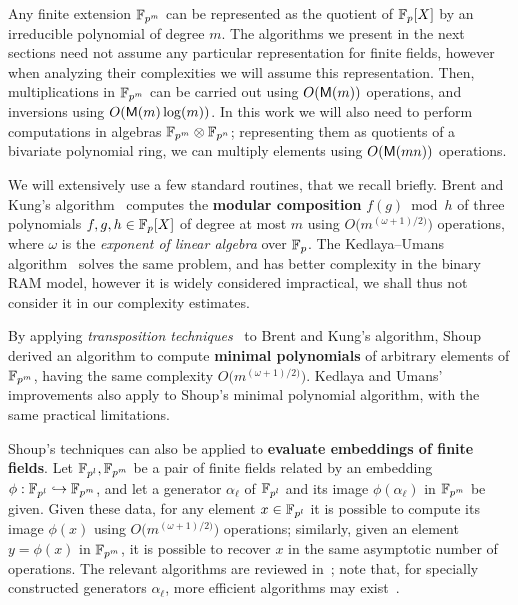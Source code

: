 \documentclass{sig-alternate}
\begin{document}
Any finite extension $\mathbb{F}_{p^m}$ can be represented as the quotient of
$\mathbb{F}_p[X]$ by an irreducible polynomial of degree $m$. %
The algorithms we present in the next sections need not assume any
particular representation for finite fields, however when analyzing
their complexities we will assume this representation. %
Then, multiplications in $\mathbb{F}_{p^m}$ can be carried out using
$O(\mathsf{M}(m))$ operations, and inversions using $O(\mathsf{M}(m)\log(m))$. %
In this work we will also need to perform computations in algebras
$\mathbb{F}_{p^m}\otimes\mathbb{F}_{p^n}$; representing them as quotients of a
bivariate polynomial ring, we can multiply elements using $O(\mathsf{M}(mn))$
operations.

We will extensively use a few standard routines, that we recall
briefly. %
Brent and Kung's algorithm~\cite{brent+kung} computes the
\textbf{modular composition} $f(g)\bmod h$ of three polynomials
$f,g,h\in\mathbb{F}_p[X]$ of degree at most $m$ using
$O\bigl(m^{(\omega+1)/2)}\bigr)$ operations, where $\omega$ is the
\emph{exponent of linear algebra} over $\mathbb{F}_p$. %
The Kedlaya--Umans algorithm~\cite{KeUm11} solves the same problem,
and has better complexity in the binary RAM model, however it is
widely considered impractical, we shall thus not consider it in our
complexity estimates.

By applying \emph{transposition
  techniques}~\cite{burgisser+clausen-shokrollahi,bostan+lecerf+schost:tellegen}
to Brent and Kung's algorithm, Shoup~\cite{shoup94,shoup99} derived an
algorithm to compute \textbf{minimal polynomials} of arbitrary
elements of $\mathbb{F}_{p^m}$, having the same complexity
$O\bigl(m^{(\omega+1)/2)}\bigr)$. %
Kedlaya and Umans' improvements also apply to Shoup's minimal
polynomial algorithm, with the same practical limitations.

Shoup's techniques can also be applied to \textbf{evaluate embeddings
  of finite fields}. %
Let $\mathbb{F}_{p^l},\mathbb{F}_{p^m}$ be a pair of finite fields related by an
embedding $\phi:\mathbb{F}_{p^l}\hookrightarrow\mathbb{F}_{p^m}$, and let a
generator $\alpha_\ell$ of $\mathbb{F}_{p^l}$ and its image
$\phi(\alpha_\ell)$ in $\mathbb{F}_{p^m}$ be given. %
Given these data, for any element $x\in\mathbb{F}_{p^l}$ it is possible to
compute its image $\phi(x)$ using $O\bigl(m^{(\omega+1)/2)}\bigr)$
operations; similarly, given an element $y=\phi(x)$ in $\mathbb{F}_{p^m}$, it
is possible to recover $x$ in the same asymptotic number of
operations. %
The relevant algorithms are reviewed in~\cite[Sec.~6]{ffisom-long};
note that, for specially constructed generators $\alpha_\ell$, more
efficient algorithms may
exist~\cite{df+schost12,DoSc12,DeDoSc13,DeDoSc2014}.
\end{document}
